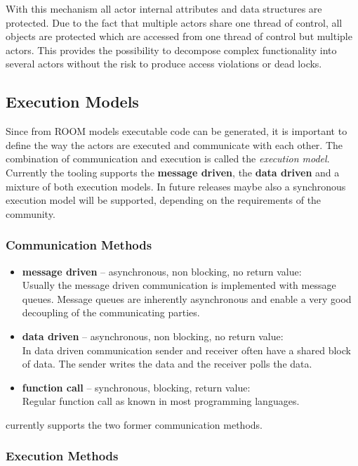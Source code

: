 With this mechanism all actor internal attributes and data structures are protected. Due to the fact that 
multiple actors share one thread of control, all objects are protected which are accessed from one thread 
of control but multiple actors. This provides the possibility to decompose complex functionality into 
several actors without the risk to produce access violations or dead locks.

\subsection{Execution Models}

Since from ROOM models executable code can be generated, it is important to define the way the actors are 
executed and communicate with each other. The combination of communication and execution is called the 
\emph{execution model}.
Currently the \eTrice{} tooling supports the \textbf{message driven}, the \textbf{data 
driven} and a mixture of both execution models. In future releases maybe also a synchronous
execution model will be supported, depending on the 
requirements of the community.

\subsubsection{Communication Methods}

\begin{itemize}
\item \textbf{message driven} -- asynchronous, non blocking, no return value:\\
Usually the message driven 
communication is implemented with message queues. Message queues are inherently asynchronous and enable a 
very good decoupling of the communicating parties.
\item \textbf{data driven} -- asynchronous, non blocking, no return value:\\
In data driven communication 
sender and receiver often have a shared block of data. The sender writes the data and the receiver polls 
the data.
\item \textbf{function call} -- synchronous, blocking, return value:\\
Regular function call as known in most 
programming languages.
\end{itemize}

\eTrice{} currently supports the two former communication methods.

\subsubsection{Execution Methods}


